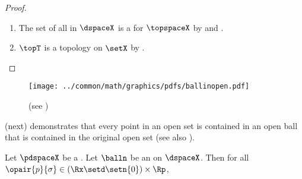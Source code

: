 \begin{proof}
\begin{enumerate}
  \item The set of all  in $\dspaceX$ is a  for $\topspaceX$ by 
         and .
        
  \item $\topT$ is a topology on $\setX$ by .
\end{enumerate}
\end{proof}

\begin{figure}[h]
  \center
  \texttt{[image: ../common/math/graphics/pdfs/ballinopen.pdf]}
  \caption{ (see ) \label{fig:ms_open} }
\end{figure}
 (next) demonstrates that every point in an open set is contained in an open ball that is 
contained in the original open set (see also ).
\begin{lemma}
\label{lem:tri_open}
Let $\pdspaceX$ be a .
Let $\balln$ be an  on $\dspaceX$.
Then for all $\opair{p}{\sigma}\in(\Rx\setd\setn{0})\times\Rp$,
\\
\end{lemma}
